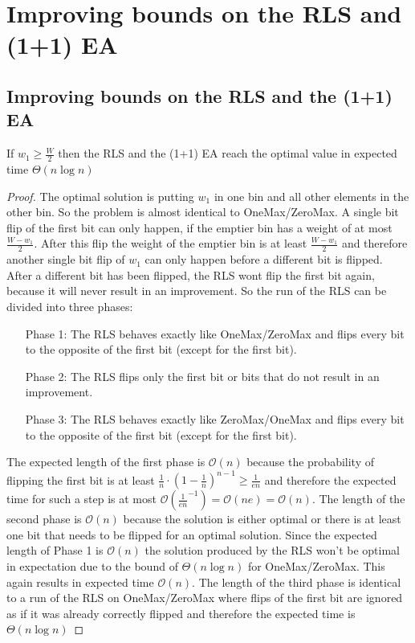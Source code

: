 \chapter{Improving bounds on the RLS and (1+1) EA}
\label{ch:Content1}

\section{Improving bounds on the RLS and the (1+1) EA}
\begin{lemma}\label{OneMaxResult}
    If $w_1 \ge \frac W 2$  then the RLS and the (1+1) EA reach the optimal value in expected time $\Theta(n\log{}n)$
\end{lemma}
\begin{proof}
    The optimal solution is putting $w_1$ in one bin and all other elements in the other bin. So the problem is almost identical to OneMax/ZeroMax. A single bit flip of the first bit can only happen, if the emptier bin has a weight of at most $\frac {W-w_1}{2}$. After this flip the weight of the emptier bin is at least $\frac {W-w_1}{2}$ and therefore another single bit flip of $w_1$ can only happen before a different bit is flipped. After a different bit has been flipped, the RLS wont flip the first bit again, because it will never result in an improvement. So the run of the RLS can be divided into three phases:
    \begin{itemize}
        \item[Phase 1:] The RLS behaves exactly like OneMax/ZeroMax and flips every bit to the opposite of the first bit (except for the first bit).
        \item[Phase 2:] The RLS flips only the first bit or bits that do not result in an improvement.
        \item[Phase 3:] The RLS behaves exactly like ZeroMax/OneMax and flips every bit to the opposite of the first bit (except for the first bit).
    \end{itemize}

    The expected length of the first phase is $\mathcal{O}(n)$ because the probability of flipping the first bit is at least ${\frac{1}{n}} \cdot {(1 - \frac{1}{n})}^{n-1} \ge \frac{1}{en}$ and therefore the expected time for such a step is at most $\mathcal{O}(\frac{1}{en}^{-1}) = \mathcal{O}(ne) = \mathcal{O}(n)$.\newline
    The length of the second phase is $\mathcal{O}(n)$ because the solution is either optimal or there is at least one bit that needs to be flipped for an optimal solution. Since the expected length of Phase 1 is $\mathcal{O}(n)$ the solution produced by the RLS won't be optimal in expectation due to the bound of $\Theta(n\log{}n)$ for OneMax/ZeroMax. This again results in expected time $\mathcal{O}(n)$.\newline
    The length of the third phase is identical to a run of the RLS on OneMax/ZeroMax where flips of the first bit are ignored as if it was already correctly flipped and therefore the expected time is $\Theta(n\log{}n)$


\end{proof}
